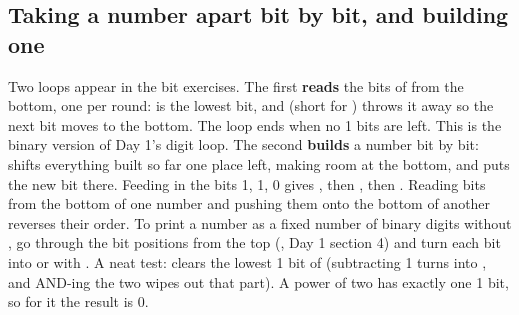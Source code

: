 \documentclass[10pt,a4paper]{article}
\begin{document}
\subsection{Taking a number apart bit by bit, and building one}
Two loops appear in the bit exercises. The first \textbf{reads} the bits of  from the bottom, one per round:  is the lowest bit, and  (short for ) throws it away so the next bit moves to the bottom. The loop  ends when no 1 bits are left. This is the binary version of Day 1’s  digit loop.
The second \textbf{builds} a number bit by bit:  shifts everything built so far one place left, making room at the bottom, and puts the new bit there. Feeding in the bits 1, 1, 0 gives , then , then . Reading bits from the bottom of one number and pushing them onto the bottom of another reverses their order.
To print a number as a fixed number of binary digits without , go through the bit positions from the top (, Day 1 section 4) and turn each bit into \code{\textquotedbl{}0\textquotedbl{}} or \code{\textquotedbl{}1\textquotedbl{}} with .
A neat test:  clears the lowest 1 bit of  (subtracting 1 turns  into , and AND-ing the two wipes out that part). A power of two has exactly one 1 bit, so for it the result is 0.
\end{document}
